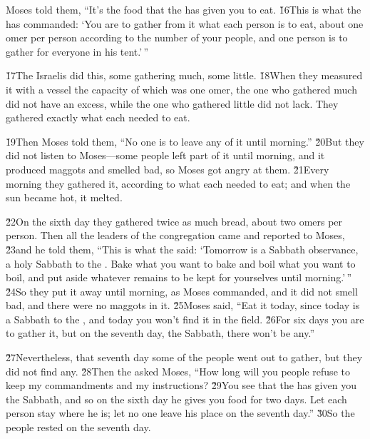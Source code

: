 Moses told them, ``It's the food that the  has given you to eat. \v{16}This is what the  has commanded: `You are to gather from it what each person is to eat, about one omer per person according to the number of your people, and one person is to gather for everyone in his tent.'\,''

\v{17}The Israelis did this, some gathering much, some little. \v{18}When they measured it with a vessel the capacity of which was one omer, the one who gathered much did not have an excess, while the one who gathered little did not lack. They gathered exactly what each needed to eat.

\v{19}Then Moses told them, ``No one is to leave any of it until morning.'' \v{20}But they did not listen to Moses---some people left part of it until morning, and it produced maggots and smelled bad, so Moses got angry at them. \v{21}Every morning they gathered it, according to what each needed to eat; and when the sun became hot, it melted.

\v{22}On the sixth day they gathered twice as much bread, about two omers per person. Then all the leaders of the congregation came and reported to Moses, \v{23}and he told them, ``This is what the  said: `Tomorrow is a Sabbath observance, a holy Sabbath to the . Bake what you want to bake and boil what you want to boil, and put aside whatever remains to be kept for yourselves until morning.'\,'' \v{24}So they put it away until morning, as Moses commanded, and it did not smell bad, and there were no maggots in it. \v{25}Moses said, ``Eat it today, since today is a Sabbath to the , and today you won't find it in the field. \v{26}For six days you are to gather it, but on the seventh day, the Sabbath, there won't be any.''

\v{27}Nevertheless, that seventh day some of the people went out to gather, but they did not find any. \v{28}Then the  asked Moses, ``How long will you people refuse to keep my commandments and my instructions? \v{29}You see that the  has given you the Sabbath, and so on the sixth day he gives you food for two days. Let each person stay where he is; let no one leave his place on the seventh day.'' \v{30}So the people rested on the seventh day.

